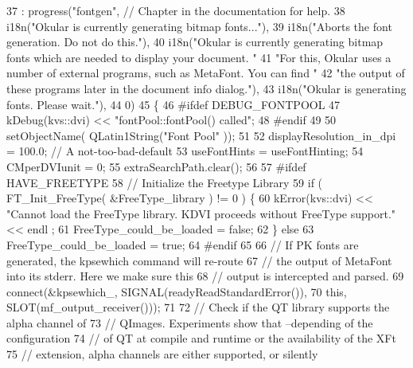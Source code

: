 \begin{DoxyCode}
37   :  progress(\textcolor{stringliteral}{"fontgen"},  \textcolor{comment}{// Chapter in the documentation for help.}
38               i18n(\textcolor{stringliteral}{"Okular is currently generating bitmap fonts..."}),
39               i18n(\textcolor{stringliteral}{"Aborts the font generation. Do not do this."}),
40               i18n(\textcolor{stringliteral}{"Okular is currently generating bitmap fonts which are needed to display your document. 
      "}
41                    \textcolor{stringliteral}{"For this, Okular uses a number of external programs, such as MetaFont. You can find "}
42                    \textcolor{stringliteral}{"the output of these programs later in the document info dialog."}),
43               i18n(\textcolor{stringliteral}{"Okular is generating fonts. Please wait."}),
44               0)
45 \{
46 \textcolor{preprocessor}{#ifdef DEBUG\_FONTPOOL}
47   kDebug(kvs::dvi) << \textcolor{stringliteral}{"fontPool::fontPool() called"};
48 \textcolor{preprocessor}{#endif}
49 
50   setObjectName( QLatin1String(\textcolor{stringliteral}{"Font Pool"} ));
51 
52   displayResolution\_in\_dpi = 100.0; \textcolor{comment}{// A not-too-bad-default}
53   useFontHints             = useFontHinting;
54   CMperDVIunit             = 0;
55   extraSearchPath.clear();
56 
57 \textcolor{preprocessor}{#ifdef HAVE\_FREETYPE}
58   \textcolor{comment}{// Initialize the Freetype Library}
59   \textcolor{keywordflow}{if} ( FT\_Init\_FreeType( &FreeType\_library ) != 0 ) \{
60     kError(kvs::dvi) << \textcolor{stringliteral}{"Cannot load the FreeType library. KDVI proceeds without FreeType support."} << endl
      ;
61     FreeType\_could\_be\_loaded = \textcolor{keyword}{false};
62   \} \textcolor{keywordflow}{else}
63     FreeType\_could\_be\_loaded = \textcolor{keyword}{true};
64 \textcolor{preprocessor}{#endif}
65 
66   \textcolor{comment}{// If PK fonts are generated, the kpsewhich command will re-route}
67   \textcolor{comment}{// the output of MetaFont into its stderr. Here we make sure this}
68   \textcolor{comment}{// output is intercepted and parsed.}
69   connect(&kpsewhich\_, SIGNAL(readyReadStandardError()),
70           \textcolor{keyword}{this}, SLOT(mf\_output\_receiver()));
71 
72   \textcolor{comment}{// Check if the QT library supports the alpha channel of}
73   \textcolor{comment}{// QImages. Experiments show that --depending of the configuration}
74   \textcolor{comment}{// of QT at compile and runtime or the availability of the XFt}
75   \textcolor{comment}{// extension, alpha channels are either supported, or silently}

\end{DoxyCode}
